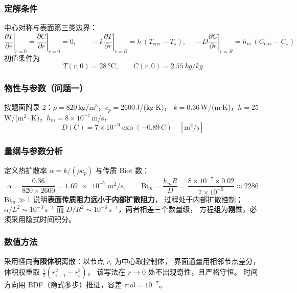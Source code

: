 \documentclass[withoutpreface,bwprint]{cumcmthesis}
\begin{document}
\subsubsection{定解条件}
中心对称与表面第三类边界：
\begin{equation}
  \left.\frac{\partial T}{\partial r}\right|_{r=0}=\left.\frac{\partial C}{\partial r}\right|_{r=0}=0,
  \qquad
  -k\left.\frac{\partial T}{\partial r}\right|_{r=R}=h\,(T_{\text{env}}-T_s),\quad
  -D\left.\frac{\partial C}{\partial r}\right|_{r=R}=h_m\,(C_{\text{env}}-C_s)
  \label{eq:bc}
\end{equation}
初值条件为
\begin{equation}
  T(r,0)=\SI{28}{\celsius},\qquad C(r,0)=\SI{2.55}{kg/kg}
  \label{eq:ic}
\end{equation}

\subsubsection{物性与参数（问题一）}
按题面附录 2：$\rho=820$\,kg/m$^3$，$c_p=2600$\,J/(kg$\cdot$K)，
$k=0.36$\,W/(m$\cdot$K)，$h=25$\,W/(m$^2\cdot$K)，$h_m=8\times10^{-7}$\,m/s，
\begin{equation}
  D(C)=7\times10^{-9}\exp(-0.89\,C)\quad[\text{m}^2/\text{s}]
  \label{eq:D1}
\end{equation}

\subsubsection{量纲与参数分析}
定义热扩散率 $\alpha=k/(\rho c_p)$ 与传质 Biot 数：
\begin{equation}
  \alpha=\frac{0.36}{820\times2600}=\SI{1.69e-7}{m^2/s},\qquad
  \mathrm{Bi}_m=\frac{h_m R}{D}=\frac{8\times10^{-7}\times0.02}{7\times10^{-9}}\approx 2286
\end{equation}
$\mathrm{Bi}_m\gg1$ 说明\textbf{表面传质阻力远小于内部扩散阻力}，
过程处于内部扩散控制；$\alpha/L^2\sim10^{-3}\,\mathrm{s^{-1}}$ 而
$D/R^2\sim10^{-6}\,\mathrm{s^{-1}}$，两者相差三个数量级，
方程组为\textbf{刚性}，必须采用隐式时间积分。

\subsubsection{数值方法}
采用径向\textbf{有限体积}离散：以节点 $r_i$ 为中心取控制体，
界面通量用相邻节点差分，体积权重取 $\tfrac12(r_{i+1}^2-r_i^2)$，
该写法在 $r\to0$ 处不出现奇性，且严格守恒。
时间方向用 BDF（隐式多步）推进，容差 $\mathrm{rtol}=10^{-7}$。
\end{document}
